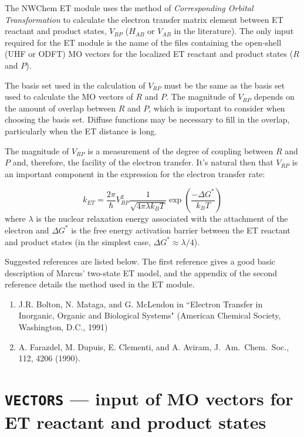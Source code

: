 \label{sec:etrans}

The NWChem ET module uses the method of {\em Corresponding Orbital Transformation} to calculate the
electron transfer matrix element between ET reactant and product states,
$V_{RP}$ ($H_{AB}$ or $V_{AB}$ in the literature). The only input required for the ET module is the
name of the files containing the open-shell (UHF or ODFT) MO vectors for the localized ET reactant and product states ($R$ and $P$).

The basis set used in the calculation of $V_{RP}$ must be the same as the basis set used to calculate the MO vectors of
$R$ and $P$.  The magnitude of $V_{RP}$ depends on the amount of overlap between $R$ and $P$,
which is important to consider when choosing the basis set.  Diffuse functions may be
necessary to fill in the overlap, particularly when the ET distance is long.

The magnitude of $V_{RP}$ is a measurement of the degree of coupling between $R$ and $P$ and,
therefore, the facility of the electron transfer.  It's natural then that $V_{RP}$ is an important component in the expression for
the electron transfer rate: 

\begin{equation} 
{k_{ET}}=
\frac{2\pi}{\hbar}
V_{RP}^{2}
\frac{1}{\sqrt{4\pi \lambda k_{B}T}}
\exp \left( \frac{- \Delta G^{*}}{k_{B} T} \right)
\end{equation}
where $\lambda$ is the nuclear relaxation energy associated with the attachment of the electron and $\Delta G^{*}$ is the
free energy activation barrier between the ET reactant and product states (in the simplest case, $\Delta G^{*} \approx \lambda / 4$).

Suggested references are listed below.  The first reference gives a good basic description 
of Marcus' two-state ET model, and the appendix of the second reference details the method used
in the ET module.

\begin{enumerate}
\item J.R. Bolton, N. Mataga, and G. McLendon in ``Electron Transfer in Inorganic, Organic and Biological Systems"
(American Chemical Society, Washington, D.C., 1991)
\item A. Farazdel, M. Dupuis, E. Clementi, and A. Aviram, 
J.~Am.~Chem.~Soc., 112, 4206 (1990).
\end{enumerate}

\section{{\tt VECTORS} --- input of MO vectors for ET reactant and product states}
\label{sec:vectors}


